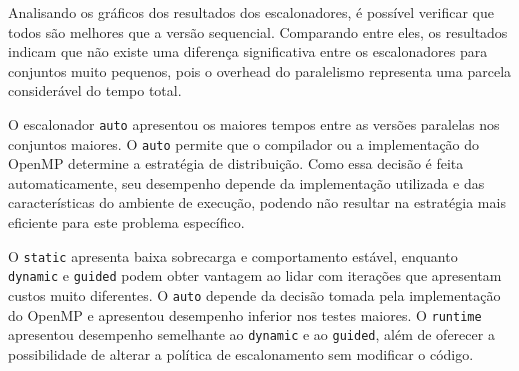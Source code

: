 \documentclass[12pt, openright, oneside, a4paper, brazil]{article}
\begin{document}
		\par{Analisando os gráficos dos resultados dos escalonadores, é possível verificar que todos são melhores que a versão sequencial. Comparando entre eles, os resultados indicam que não existe uma diferença significativa entre os escalonadores para conjuntos muito pequenos, pois o overhead do paralelismo representa uma parcela considerável do tempo total.}
		\par{O escalonador \texttt{auto} apresentou os maiores tempos entre as versões paralelas nos conjuntos maiores. O \texttt{auto} permite que o compilador ou a implementação do OpenMP determine a estratégia de distribuição. Como essa decisão é feita automaticamente, seu desempenho depende da implementação utilizada e das características do ambiente de execução, podendo não resultar na estratégia mais eficiente para este problema específico.}
		\par{O \texttt{static} apresenta baixa sobrecarga e comportamento estável, enquanto \texttt{dynamic} e \texttt{guided} podem obter vantagem ao lidar com iterações que apresentam custos muito diferentes. O \texttt{auto} depende da decisão tomada pela implementação do OpenMP e apresentou desempenho inferior nos testes maiores. O \texttt{runtime} apresentou desempenho semelhante ao \texttt{dynamic} e ao \texttt{guided}, além de oferecer a possibilidade de alterar a política de escalonamento sem modificar o código.}
\end{document}

